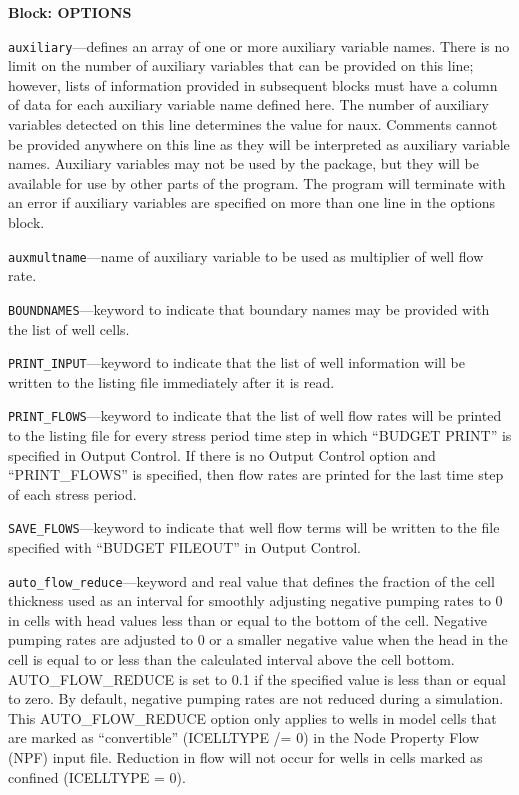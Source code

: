 
\item \textbf{Block: OPTIONS}

\begin{description}
\item \texttt{auxiliary}---defines an array of one or more auxiliary variable names.  There is no limit on the number of auxiliary variables that can be provided on this line; however, lists of information provided in subsequent blocks must have a column of data for each auxiliary variable name defined here.   The number of auxiliary variables detected on this line determines the value for naux.  Comments cannot be provided anywhere on this line as they will be interpreted as auxiliary variable names.  Auxiliary variables may not be used by the package, but they will be available for use by other parts of the program.  The program will terminate with an error if auxiliary variables are specified on more than one line in the options block.

\item \texttt{auxmultname}---name of auxiliary variable to be used as multiplier of well flow rate.

\item \texttt{BOUNDNAMES}---keyword to indicate that boundary names may be provided with the list of well cells.

\item \texttt{PRINT\_INPUT}---keyword to indicate that the list of well information will be written to the listing file immediately after it is read.

\item \texttt{PRINT\_FLOWS}---keyword to indicate that the list of well flow rates will be printed to the listing file for every stress period time step in which ``BUDGET PRINT'' is specified in Output Control.  If there is no Output Control option and ``PRINT\_FLOWS'' is specified, then flow rates are printed for the last time step of each stress period.

\item \texttt{SAVE\_FLOWS}---keyword to indicate that well flow terms will be written to the file specified with ``BUDGET FILEOUT'' in Output Control.

\item \texttt{auto\_flow\_reduce}---keyword and real value that defines the fraction of the cell thickness used as an interval for smoothly adjusting negative pumping rates to 0 in cells with head values less than or equal to the bottom of the cell. Negative pumping rates are adjusted to 0 or a smaller negative value when the head in the cell is equal to or less than the calculated interval above the cell bottom. AUTO\_FLOW\_REDUCE is set to 0.1 if the specified value is less than or equal to zero. By default, negative pumping rates are not reduced during a simulation.  This AUTO\_FLOW\_REDUCE option only applies to wells in model cells that are marked as ``convertible'' (ICELLTYPE /= 0) in the Node Property Flow (NPF) input file. Reduction in flow will not occur for wells in cells marked as confined (ICELLTYPE = 0).


\end{description}
